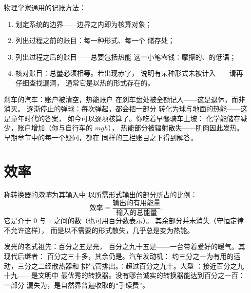 \begin{method}[任何过程的能量核算]\label{met:g9:energy-conversions:audit}
物理学家通用的记账方法：
\begin{enumerate}
  \item 划定系统的边界——边界之内即为核算对象；
  \item 列出过程之前的账目：每一种形式、每一个
        储存处；
  \item 列出过程之后的账目——总要包括热能
        这一小笔零钱：摩擦的、的低语；
  \item 核对账目：总量必须相等。若出现赤字，
        说明有某种形式未被计入——请再仔细查找漏洞，
        通常它是以热的形式存在的。
\end{enumerate}
\end{method}

\begin{example}[核算示例]\label{ex:g9:energy-conversions:audits}
刹车的汽车：账户被清空，热能账户
在刹车盘处被全额记入——这是退休，而非消灭。
逐渐停止的弹球：每次弹起，都会把一部分
转化为球与地面的热能——这是童年时代的答案，
如今可以逐项核算了。你吃着早餐骑车上坡：
化学能储存减少，账户增加（你与自行车的 $m g h$），
热能部分被辐射散失——肌肉因此发热。
早期章节中的每一个疑问，都在
同样的三栏账目之下得到解答。
\end{example}

\section{效率}

\begin{definition}[效率]\label{def:g9:energy-conversions:efficiency}
称转换器的\emph{效率}为其输入中
以所需形式输出的部分所占的比例：
\[
\text{效率} =
\frac{\text{输出的有用能量}}{\text{输入的总能量}},
\]
它是介于 $0$ 与 $1$ 之间的数（也可用百分数表示）。
其余部分并未消失（守恒定律不允许这样），
而是以不需要的形式散失，几乎总是变为热能。
\end{definition}

\begin{example}[成绩单]\label{ex:g9:energy-conversions:reportcards}
发光的老式祖先：百分之五是光，
百分之九十五是——一台带着爱好的暖气。其现代后继者：
百分之三十多，其余仍是。汽车发动机：
约三分之一为有用的运动，三分之二经散热器和
排气管排出。：超过百分之九十。大型
：接近百分之九十九——是文明中
最优秀的转换器。没有哪台诚实的转换器能达到百分之一百：一部分
漏失为，是自然界普遍收取的“手续费”。
\end{example}

